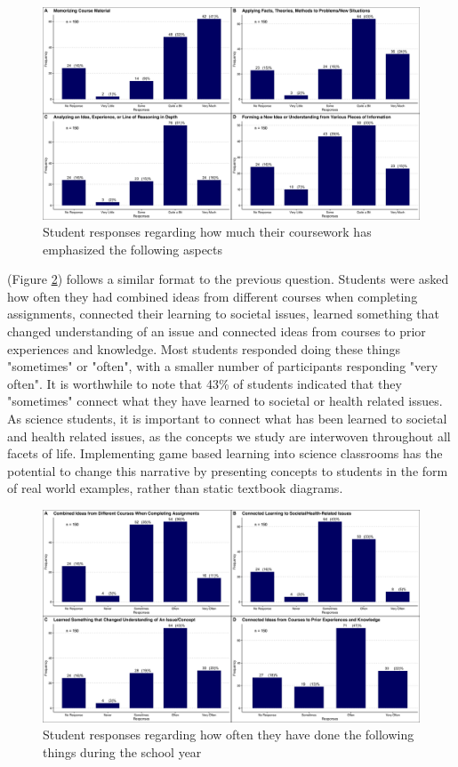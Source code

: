 \documentclass[10pt]{article}
\providecommand{\figref}[1]{(Figure \ref{#1})}  %
\begin{document}
\begin{figure}[H]
	\includegraphics[width=\textwidth]{figures_4f06/howmuch_coursework_emphasized_thefollowing.jpg}
	\caption{Student responses regarding how much their coursework has emphasized the following aspects}
	\label{fig:3}
\end{figure}

\figref{fig:4} follows a similar format to the previous question. Students were asked how often they had combined ideas from different courses when completing assignments, connected their learning to societal issues, learned something that changed understanding of an issue and connected ideas from courses to prior experiences and knowledge. Most students responded doing these things "sometimes" or "often", with a smaller number of participants responding "very often". It is worthwhile to note that 43\% of students indicated that they "sometimes" connect what they have learned to societal or health related issues. As science students, it is important to connect what has been learned to societal and health related issues, as the concepts we study are interwoven throughout all facets of life. Implementing game based learning into science classrooms has the potential to change this narrative by presenting concepts to students in the form of real world examples, rather than static textbook diagrams.

\begin{figure}[H]
	\includegraphics[width=\textwidth]{figures_4f06/how_often_haveyou_done_thefollowing.jpg}
	\caption{Student responses regarding how often they have done the following things during the school year}
	\label{fig:4}
\end{figure}
\end{document}
